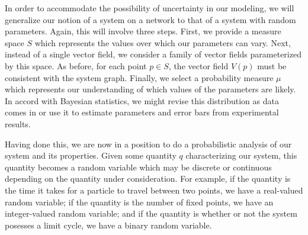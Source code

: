 In order to accommodate the possibility of uncertainty in our
modeling, we will generalize our notion of a system on a network to
that of a system with random parameters.  Again, this will involve
three steps. First, we provide a measure space $S$
which represents the values over which our parameters can vary. Next,
instead of a single vector field, we consider a family of vector
fields parameterized by this space.  As before, for
each point $p \in S$, the vector field $V(p)$ must be consistent with
the system graph. Finally, we select a probability measure $\mu$ which represents our understanding of which values of the parameters
are likely. In accord with Bayesian statistics, we might revise this
distribution as data comes in or use it to estimate parameters and error
bars from experimental results.

Having done this, we are now in a position to do a probabilistic analysis
of our system and its properties.  Given some quantity $q$ characterizing
our system, this quantity becomes a random variable which may be discrete or
continuous depending on the quantity under consideration.  For example, if
the quantity is the time it takes for a particle to travel between two points,
we have a real-valued random variable; if the quantity is the number of fixed
points, we have an integer-valued random variable; and if the quantity is
whether or not the system posesses a limit cycle, we have a binary random
variable.

